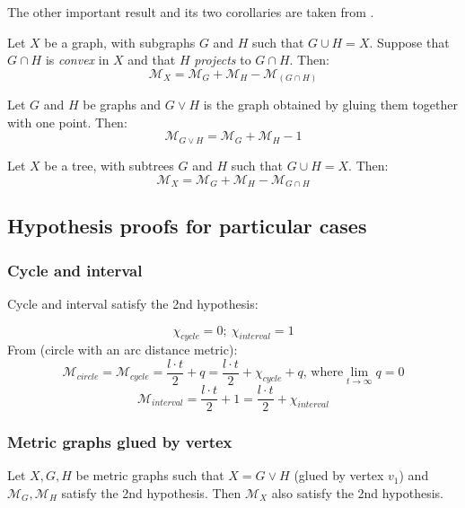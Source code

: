\documentclass{article}
\begin{document}
The other important result and its two corollaries are taken from \textcite{LEINSTER_2017}.

\begin{theorem}
Let $X$ be a graph, with subgraphs $G$ and $H$ such that $G \cup H = X$. Suppose
    that $G \cap H$ is \textit{convex} in $X$ and that $H$ \textit{projects} to $G \cap H$. Then:
    $$\mathcal{M}_X = \mathcal{M}_G + \mathcal{M}_H - \mathcal{M}_{(G \cap H)}$$
\end{theorem}
\begin{corollary}
    Let $G$ and $H$ be graphs and $G \vee H$ is the graph obtained by gluing them
    together with one point. Then:
    $$\mathcal{M}_{G \vee H} = \mathcal{M}_{G} + \mathcal{M}_{H} - 1$$
\end{corollary}

\begin{corollary}
    Let $X$ be a tree, with subtrees $G$ and $H$ such that $G \cup H = X$. Then:
    $$ \mathcal{M}_X = \mathcal{M}_G + \mathcal{M}_H - \mathcal{M}_{G \cap H}$$
\end{corollary}

\subsection{Hypothesis proofs for particular cases}

\subsubsection{Cycle and interval}

Cycle and interval satisfy the 2nd hypothesis:

$$\chi_{cycle} = 0; \  \chi_{interval} = 1$$ From \textcite{Leinster_2012} (circle with an arc distance metric):
$$\mathcal{M}_{circle} = \mathcal{M}_{cycle} = \frac{l \cdot t}{2} + q = \frac{l \cdot t}{2} + \chi_{cycle} + q \text{, where} \lim_{t \rightarrow \infty} q = 0$$
$$\mathcal{M}_{interval} = \frac{l \cdot t}{2} + 1 = \frac{l \cdot t}{2} + \chi_{interval}$$

\subsubsection{Metric graphs glued by vertex}

\begin{theorem}
    Let $X, G, H$ be metric graphs such that $X = G \vee H$ (glued by vertex $v_1$)
    and $\mathcal{M}_G, \mathcal{M}_H$ satisfy the 2nd hypothesis. Then $\mathcal{M}_{X}$
    also satisfy the 2nd hypothesis.
\end{theorem}
\end{document}
